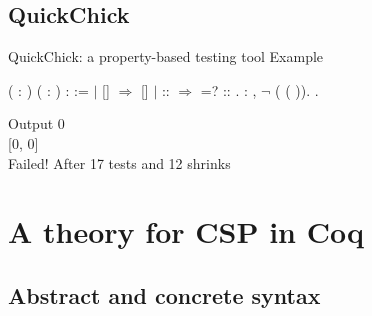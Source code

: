 \documentclass[t]{beamer}
\begin{document}
\subsection{QuickChick}

\begin{frame}{QuickChick: a property-based testing tool}
	Example
	\vskip 0.1in
	\small
	\begin{coqdoccode}
		\coqdocnoindent
		  ( : ) ( :  ) :   :=\coqdoceol
		\coqdocindent{1.00em}
		  \coqdoceol
		\coqdocindent{2.00em}
		\ensuremath{|} []   \ensuremath{\Rightarrow} []\coqdoceol
		\coqdocindent{2.00em}
		\ensuremath{|} :: \ensuremath{\Rightarrow}   =?      ::   \coqdoceol
		\coqdocindent{1.00em}
		.\coqdoceol
		\coqdocemptyline
		\coqdocnoindent
		  : \coqdockw{\ensuremath{\forall}}  ,  \ensuremath{\lnot} (  (  )).\coqdoceol
		\coqdocemptyline
		\coqdocnoindent
		 .\coqdoceol
	\end{coqdoccode}

	\vskip 0.2in
	\normalsize
	Output
	\vskip 0.1in
	\ttfamily
	\small
	0\\
	{[0, 0]}\\
	Failed! After 17 tests and 12 shrinks
\end{frame}

\section{A theory for CSP in Coq}

\subsection{Abstract and concrete syntax}
\end{document}
